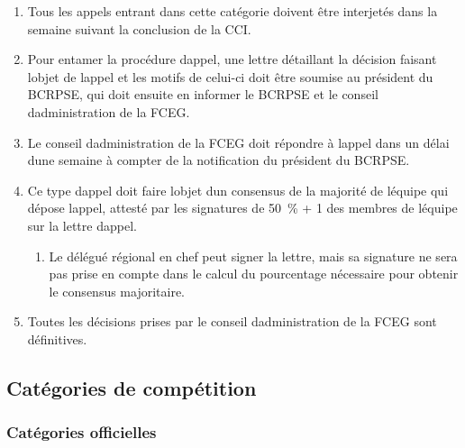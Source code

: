 \begin{enumerate}
 \item
  Tous les appels entrant dans cette catégorie doivent être interjetés dans la semaine suivant la conclusion de la CCI.
 \item
  Pour entamer la procédure d\textquotesingle appel, une lettre détaillant la décision faisant l\textquotesingle objet de l\textquotesingle appel et les motifs de celui-ci doit être soumise au président du BCRPSE, qui doit ensuite en informer le BCRPSE et le conseil d\textquotesingle administration de la FCEG.
 \item
  Le conseil d\textquotesingle administration de la FCEG doit répondre à l\textquotesingle appel dans un délai d\textquotesingle une semaine à compter de la notification du président du BCRPSE.
 \item
  Ce type d\textquotesingle appel doit faire l\textquotesingle objet d\textquotesingle un consensus de la majorité de l\textquotesingle équipe qui dépose l\textquotesingle appel, attesté par les signatures de 50~\% + 1 des membres de l\textquotesingle équipe sur la lettre d\textquotesingle appel.

  \begin{enumerate}
   \item
    Le délégué régional en chef peut signer la lettre, mais sa signature ne sera pas prise en compte dans le calcul du pourcentage nécessaire pour obtenir le consensus majoritaire.
  \end{enumerate}

 \item
  Toutes les décisions prises par le conseil d\textquotesingle administration de la FCEG sont définitives.
\end{enumerate}

\subsection{Catégories de compétition}
\label{categories-de-competition}

\subsubsection{Catégories officielles}
\label{categories-officielles}


